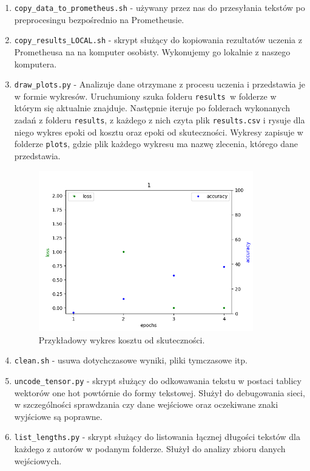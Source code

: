 \begin{enumerate}
	\item {\texttt{copy\_data\_to\_prometheus.sh} } - używany przez nas do przesyłania tekstów po preprocesingu
	bezpośrednio na Prometheusie. 
	
	\item {\texttt{copy\_results\_LOCAL.sh} } - skrypt służący do kopiowania rezultatów uczenia z Prometheusa na 
	na komputer osobisty. Wykonujemy go lokalnie z naszego komputera. 

	\item {\texttt{draw\_plots.py} } - Analizuje dane otrzymane z procesu uczenia i przedstawia je w formie wykresów.
	Uruchumiony szuka folderu \texttt{results }w folderze w którym się aktualnie znajduje. Następnie iteruje po folderach
	wykonanych zadań z folderu \texttt{results}, z każdego z nich czyta plik \texttt{results.csv} i rysuje dla niego wykres epoki od kosztu
 	oraz epoki od skuteczności. Wykresy zapisuje w folderze \texttt{plots}, gdzie plik każdego wykresu ma nazwę 
 	zlecenia, którego dane przedstawia.
 	
 	\begin{figure}[H]
	\centering
	\includegraphics[height=7cm]{./images/plot.png}
	\caption{Przykładowy wykres kosztu od skuteczności.}
	\label{fig:test5}
	\end{figure}
 	
	
	\item {\texttt{clean.sh} } - usuwa dotychczasowe wyniki, pliki tymczasowe itp.
	
	\item {\texttt{uncode\_tensor.py} } - skrypt służący do odkowawania tekstu w postaci tablicy wektorów one hot powtórnie do 
 	formy tekstowej. Służył do debugowania sieci, w szczególności sprawdzania czy dane wejściowe oraz 
 	oczekiwane znaki wyjściowe są poprawne.
 	
 	\item {\texttt{list\_lengths.py} } - skrypt służący do listowania łącznej długości tekstów dla każdego z autorów
 	w podanym folderze. Służył do analizy zbioru danych wejściowych.
	
	
	
\end{enumerate}



